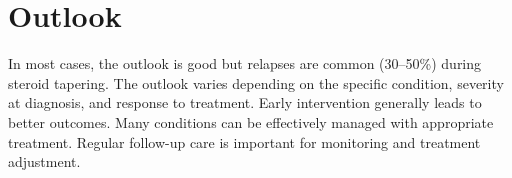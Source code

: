 \section{Outlook}
In most cases, the outlook is good but relapses are common (30--50\%) during steroid tapering. The outlook varies depending on the specific condition, severity at diagnosis, and response to treatment. Early intervention generally leads to better outcomes. Many conditions can be effectively managed with appropriate treatment. Regular follow-up care is important for monitoring and treatment adjustment.

